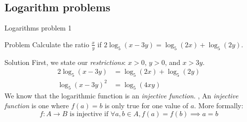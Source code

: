 \subsection{Logarithm problems}
\begin{namedframe}{Logarithms problem 1}
	\begin{exampleblock}{Problem}
		Calculate the ratio $\frac{x}{y}$ if $2\log_5(x-3y) = \log_5(2x) + \log_5(2y)$.
	\end{exampleblock}
	\begin{block}{Solution}
		First, we state our \emph{restrictions}: \pause $x > 0$, $y > 0$, and $x > 3y$.
		\pause
		\begin{align*}
			2\log_5(x-3y)  &= \log_5(2x) + \log_5(2y)\\
			\log_5(x-3y)^2 &= \log_5(4xy)
		\end{align*}
		\pause
		We know that the logarithmic function is an \emph{injective function}.
		\sep
		An \emph{injective function} is one where $f(a) = b$ is only true for one value of $a$.
		More formally:
		\vspace{-2ex}
		\[f \colon A \to B \text{ is injective if } \forall a, b \in A, f(a) = f(b) \implies a = b\]
		\vspace{-4ex}
	\end{block}
\end{namedframe}
